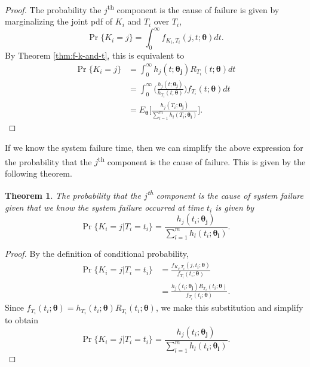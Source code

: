 \documentclass[
]{article}
\theoremstyle{definition}
\theoremstyle{plain}
\newtheorem{theorem}{Theorem}[section]
\theoremstyle{definition}
\theoremstyle{definition}
\theoremstyle{definition}
\theoremstyle{definition}
\theoremstyle{remark}
\begin{document}
\begin{proof}
The probability the \(j\)\textsuperscript{th} component is the cause of failure is given by
marginalizing the joint pdf of \(K_i\) and \(T_i\) over \(T_i\),
\[
\Pr\{K_i = j\} = \int_0^{\infty} f_{K_i,T_i}(j,t;\boldsymbol{\theta}) dt.
\]
By Theorem \ref{thm:f-k-and-t}, this is equivalent to
\begin{align*}
\Pr\{K_i = j\}
    &= \int_0^{\infty} h_j(t;\boldsymbol{\theta_j}) R_{T_i}(t;\boldsymbol{\theta}) dt\\
    &= \int_0^{\infty} \biggl(\frac{h_j(t;\boldsymbol{\theta_j})}{h_{T_i}(t ; \boldsymbol{\theta})}\biggr) f_{T_i}(t ; \boldsymbol{\theta}) dt\\
    &= E_{\boldsymbol{\theta}}\biggl[\frac{h_j(T_i;\boldsymbol{\theta_j})}{\sum_{l=1}^m h_l(T_i ; \boldsymbol{\theta_l})}\biggr].
\end{align*}
\end{proof}

If we know the system failure time, then we can simplify the above expression
for the probability that the \(j\)\textsuperscript{th} component is the cause of
failure. This is given by the following theorem.

\begin{theorem}
\protect\hypertarget{thm:prob-k-given-t}{}\label{thm:prob-k-given-t}The probability that the \(j\)\textsuperscript{th}
component is the cause of system failure given that we know the system failure
occurred at time \(t_i\) is given by
\[
\Pr\{K_i = j|T_i=t_i\} = \frac{h_j(t_i;\boldsymbol{\theta_j})}{\sum_{l=1}^m h_l(t_i;\boldsymbol{\theta_l})}.
\]
\end{theorem}

\begin{proof}
By the definition of conditional probability,
\begin{align*}
    \Pr\{K_i = j|T_i = t_i\} 
        &= \frac{f_{K_i,T_i}(j, t_i;\boldsymbol{\theta})}{f_{T_i}(t_i;\boldsymbol{\theta})}\\
        &= \frac{h_j(t_i;\boldsymbol{\theta_j}) R_{T_i}(t_i;\boldsymbol{\theta})}{f_{T_i}(t_i;\boldsymbol{\theta})}.
\end{align*}
Since \(f_{T_i}(t_i;\boldsymbol{\theta}) = h_{T_i}(t_i;\boldsymbol{\theta}) R_{T_i}(t_i;\boldsymbol{\theta})\),
we make this substitution and simplify to obtain
\[
\Pr\{K_i = j|T_i = t_i\} = \frac{h_j(t_i;\boldsymbol{\theta_j})}{\sum_{l=1}^m h_l(t_i;\boldsymbol{\theta_l})}.
\]
\end{proof}
\end{document}
